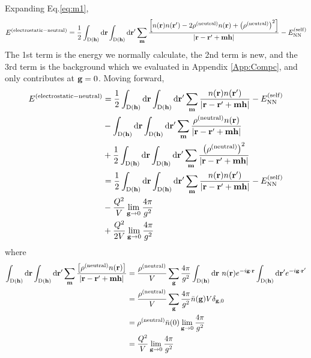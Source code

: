 \documentclass[paper=a4, fontsize=11pt]{article} %
\numberwithin{equation}{section} %
\numberwithin{figure}{section} %
\numberwithin{table}{section} %
\newcommand{\bh}{{\bf{h}}}
\newcommand{\bm}{{\bf{m}}}
\newcommand{\bg}{{\bf{g}}}
\newcommand{\br}{{\bf{r}}}
\newcommand{\rNN}{{\mathrm{NN}}}
\newcommand{\rself}{{\mathrm{self}}}
\newcommand{\rd}{{\mathrm{d}}}
\newcommand{\rD}{{\mathrm{D}}}
\begin{document}
Expanding Eq.\eqref{eq:m1},
\begin{equation}
\begin{split}
E^{(\mathrm{electrostatic-neutral})}
&= \frac{1}{2}\int_{\rD(\bh)} \rd \br \int_{\rD(\bh)}\rd \br'\sum_\bm \frac{\left[n(\br)n(\br')-2\rho^{(\mathrm{neutral})}n(\br) + \left(\rho^{(\mathrm{neutral})}\right)^2\right]}{|\br-\br'+\bm\bh|} - E_{\rNN}^{(\rself)}\\
\end{split}
\end{equation}
The 1st term is the energy we normally calculate, the 2nd term is new, and the 3rd term is the background which we evaluated in Appendix \ref{App:Compc}, and only contributes at $\bg = 0$. Moving forward, 
\begin{equation}
\begin{split}
E^{(\mathrm{electrostatic-neutral})}
&= \frac{1}{2}\int_{\rD(\bh)} \rd \br \int_{\rD(\bh)}\rd \br'\sum_\bm \frac{n(\br)n(\br')}{|\br-\br'+\bm\bh|} - E_{\rNN}^{(\rself)} \\
&- \int_{\rD(\bh)} \rd \br \int_{\rD(\bh)}\rd \br'\sum_\bm \frac{\rho^{(\mathrm{neutral})}n(\br)}{|\br-\br'+\bm\bh|} \\
&+ \frac{1}{2}\int_{\rD(\bh)} \rd \br \int_{\rD(\bh)}\rd \br'\sum_\bm \frac{\left(\rho^{(\mathrm{neutral})}\right)^2}{|\br-\br'+\bm\bh|} \\
&= \frac{1}{2}\int_{\rD(\bh)} \rd \br \int_{\rD(\bh)}\rd \br'\sum_\bm \frac{n(\br)n(\br')}{|\br-\br'+\bm\bh|} - E_{\rNN}^{(\rself)} \\
&- \frac{Q^2}{V}\lim_{\bg \rightarrow 0} \frac{4\pi}{g^2}\\
&+ \frac{Q^2}{2V} \lim_{\bg \rightarrow 0} \frac{4\pi}{g^2}\\
\end{split}
\end{equation}
where
\begin{equation}
\begin{split}
\int_{\rD(\bh)} \rd \br \int_{\rD(\bh)}\rd \br'\sum_\bm \frac{\left[\rho^{(\mathrm{neutral})}n(\br)\right]}{|\br-\br'+\bm\bh|}
&= \frac{\rho^{(\mathrm{neutral})}}{V} \sum_{\bg} \frac{4\pi}{g^2}\int_{\rD(\bh)}\rd \br\ n(\br) e^{-i\bg\cdot \br} \int_{\rD(\bh)} \rd \br'  e^{-i\bg\cdot \br'}\\
&= \frac{\rho^{(\mathrm{neutral})}}{V} \sum_{\bg} \frac{4\pi}{g^2} \bar n(\bg) V \delta_{\bg,0} \\
&= \rho^{(\mathrm{neutral})} \bar n(0)\lim_{\bg \rightarrow 0} \frac{4\pi}{g^2}  \\
&= \frac{Q^2}{V}\lim_{\bg \rightarrow 0} \frac{4\pi}{g^2} \\
\end{split}
\end{equation}
\end{document}
